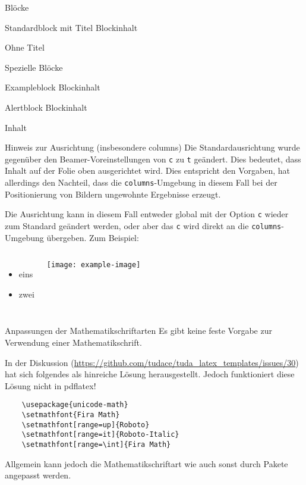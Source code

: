 \documentclass[
	ngerman,%
	aspectratio=169,%
	accentcolor=2d,%
	logo=false,%
	colorframetitle=true,%
	]{tudabeamer}
\let\code\texttt
\begin{document}
\begin{frame}{Blöcke}
\begin{block}{Standardblock mit Titel}
	Blockinhalt
\end{block}
\begin{block}{}
	Ohne Titel
\end{block}
\end{frame}

\begin{frame}{Spezielle Blöcke}
\begin{exampleblock}{Exampleblock}
	Blockinhalt
\end{exampleblock}
\begin{alertblock}{Alertblock}
	Blockinhalt
\end{alertblock}
\begin{example}
	Inhalt
\end{example}
\end{frame}

\begin{frame}{Hinweis zur Ausrichtung (insbesondere columns)}
	Die Standardausrichtung wurde gegenüber den Beamer-Voreinstellungen von \code{c} zu \code{t} geändert. Dies bedeutet, dass Inhalt auf der Folie oben ausgerichtet wird. Dies entspricht den Vorgaben, hat allerdings den Nachteil, dass die \code{columns}-Umgebung in diesem Fall bei der Positionierung von Bildern ungewohnte Ergebnisse erzeugt.

	Die Ausrichtung kann in diesem Fall entweder global mit der Option \code{c} wieder zum Standard geändert werden, oder aber das \code{c} wird direkt an die \code{columns}-Umgebung übergeben. Zum Beispiel:
\begin{columns}[onlytextwidth,c]%
	\begin{itemize}
		\item eins
		\item zwei
	\end{itemize}
	\texttt{[image: example-image]}
\end{columns}
\end{frame}


\begin{frame}[fragile]{Anpassungen der Mathematikschriftarten}
	Es gibt keine feste Vorgabe zur Verwendung einer Mathematikschrift.

	In der Diskussion (\url{https://github.com/tudace/tuda_latex_templates/issues/30}) hat sich folgendes als hinreiche Lösung herausgestellt. Jedoch funktioniert diese Lösung nicht in pdflatex!
	\begin{verbatim}
	\usepackage{unicode-math}
	\setmathfont{Fira Math}
	\setmathfont[range=up]{Roboto}
	\setmathfont[range=it]{Roboto-Italic}
	\setmathfont[range=\int]{Fira Math}
	\end{verbatim}
	Allgemein kann jedoch die Mathematikschriftart wie auch sonst durch Pakete angepasst werden.
\end{frame}
\end{document}
